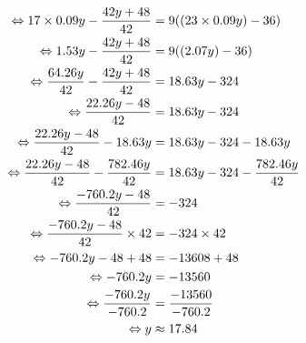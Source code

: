 \documentclass{article}%
\begin{document}
\begin{align*}%
\ \Leftrightarrow  17 \times 0.09y - \frac{42y + 48}{42} &= 9((23 \times 0.09y) - 36) \\%
\vspace{5mm}%
\newline%
\ \Leftrightarrow  1.53y - \frac{42y + 48}{42} &= 9((2.07y) - 36) \\%
\vspace{5mm}%
\newline%
\ \Leftrightarrow  \frac{64.26y}{42} - \frac{42y + 48}{42} &= 18.63y - 324 \\%
\vspace{5mm}%
\newline%
\ \Leftrightarrow    \frac{22.26y - 48}{42} &= 18.63y - 324 \\%
\vspace{5mm}%
\newline%
\ \Leftrightarrow    \frac{22.26y - 48}{42} - 18.63y &= 18.63y - 324 - 18.63y\\%
\vspace{5mm}%
\newline%
\ \Leftrightarrow    \frac{22.26y - 48}{42} - \frac{782.46y}{42} &= 18.63y - 324 - \frac{782.46y}{42}\\%
\vspace{5mm}%
\newline%
\ \Leftrightarrow   \frac{-760.2y - 48}{42}  &= - 324 \\%
\vspace{5mm}%
\newline%
\ \Leftrightarrow   \frac{-760.2y - 48}{42}  \times 42 &= - 324 \times 42 \\%
\vspace{5mm}%
\newline%
\ \Leftrightarrow   -760.2y - 48 + 48 &= - 13608 + 48 \\%
\vspace{5mm}%
\newline%
\ \Leftrightarrow   -760.2y &= - 13560 \\%
\vspace{5mm}%
\newline%
\ \Leftrightarrow   \frac{-760.2y}{-760.2} &=  \frac{-13560}{-760.2} \\%
\vspace{5mm}%
\newline%
\ \Leftrightarrow   y &\approx  17.84 \\%
\vspace{5mm}%
\newline%
\end{align*}%
\end{document}
